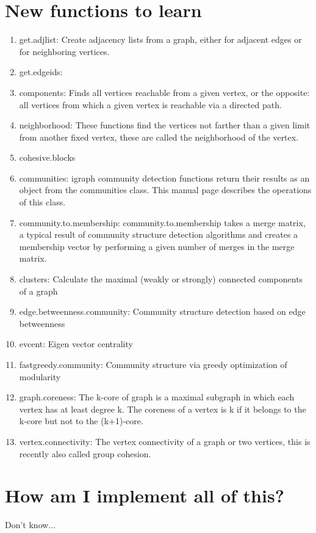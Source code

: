 \documentclass[12pt]{article}
\begin{document}
\section*{New functions to learn}
\begin{enumerate}
  \item get.adjlist: Create adjacency lists from a graph, either for adjacent edges or for neighboring vertices.
  \item get.edgeids: 
  \item components: Finds all vertices reachable from a given vertex, or the opposite: all vertices from which a given vertex is reachable via a directed path.
  \item  neighborhood: These functions find the vertices not farther than a given limit from another fixed vertex, these are called the neighborhood of the vertex.
  \item cohesive.blocks 
  \item communities: igraph community detection functions return their results as an object from the communities class. This manual page describes the operations of this class.
  \item community.to.membership: community.to.membership takes a merge matrix, a typical result of community structure detection algorithms and creates a membership vector by performing a given number of merges in the merge matrix.
  \item clusters: Calculate the maximal (weakly or strongly) connected components of a graph
  \item edge.betweenness.community: Community structure detection based on edge betweenness
  \item evcent: Eigen vector centrality
  \item fastgreedy.community: Community structure via greedy optimization of modularity
  \item graph.coreness: The k-core of graph is a maximal subgraph in which each vertex has at least degree k. The coreness of a vertex is k if it belongs to the k-core but not to the (k+1)-core.
  
  \item vertex.connectivity: The vertex connectivity of a graph or two vertices, this is recently also called group cohesion.  
\end{enumerate}

\section*{How am I implement all of this?}
Don't know...
\end{document}
